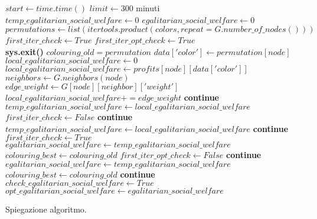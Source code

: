 \begin{algorithmic}

\State $start\gets time.time()$
\State $limit\gets 300$  minuti \\

\State $temp\_egalitarian\_social\_welfare\gets 0$
\State $egalitarian\_social\_welfare\gets 0$
\State $permutations\gets list(itertools.product(colors, repeat=G.number\_of\_nodes()))$
\State $first\_iter\_check\gets True$
\State $first\_iter\_opt\_check\gets True$ \\

		\State \textbf{sys.exit()}
	\EndIf
	\State $colouring\_old = permutation$
		\State $data['color']\gets permutation[node]$
	\EndFor
		\State $local\_egalitarian\_social\_welfare\gets 0$
		\State $local\_egalitarian\_social\_welfare\gets profits[node][data['color']]$
		\State $neighbors\gets G.neighbors(node)$
				\State $edge\_weight\gets G[node][neighbor]['weight']$
				\State $local\_egalitarian\_social\_welfare += edge\_weight$
			\Else
				\State \textbf{continue}
			\EndIf
		\EndFor
			\State $temp\_egalitarian\_social\_welfare\gets local\_egalitarian\_social\_welfare$
			\State $first\_iter\_check\gets False$
			\State \textbf{continue}
		\EndIf	
			\State $temp\_egalitarian\_social\_welfare\gets local\_egalitarian\_social\_welfare$
		\Else
			\State \textbf{continue}	
		\EndIf
	\State $first\_iter\_check\gets True$
		\State $egalitarian\_social\_welfare\gets temp\_egalitarian\_social\_welfare$
		\State $colouring\_best\gets colouring\_old$
		\State $first\_iter\_opt\_check\gets False$
		\State \textbf{continue}
	\EndIf	
		\State $egalitarian\_social\_welfare\gets temp\_egalitarian\_social\_welfare$
		\State $colouring\_best\gets colouring\_old$
	\Else
		\State \textbf{continue}	
	\EndIf
	\EndFor
\EndFor \\

\State $check\_egalitarian\_social\_welfare\gets True$
\State $opt\_egalitarian\_social\_welfare\gets egalitarian\_social\_welfare$ \\

\end{algorithmic}

Spiegazione algoritmo.